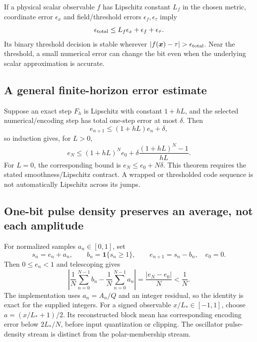 \documentclass[11pt,a4paper]{article}
\newcommand{\ind}{\mathbf{1}}
\numberwithin{equation}{section}
\begin{document}
If a physical scalar observable $f$ has Lipschitz constant $L_f$ in the chosen metric, coordinate error $\epsilon_x$ and field/threshold errors $\epsilon_f,\epsilon_\tau$ imply
\begin{equation}
\epsilon_{\rm total}\le L_f\epsilon_x+\epsilon_f+\epsilon_\tau.
\end{equation}
Its binary threshold decision is stable wherever
$|f(\bm x)-\tau|>\epsilon_{\rm total}$. Near the threshold, a small numerical error can change the bit even when the underlying scalar approximation is accurate.

\subsection{A general finite-horizon error estimate}
Suppose an exact step $F_h$ is Lipschitz with constant $1+hL$, and the selected numerical/encoding step has total one-step error at most $\delta$. Then
\begin{equation}
e_{n+1}\le(1+hL)e_n+\delta,
\end{equation}
so induction gives, for $L>0$,
\begin{equation}
e_N\le(1+hL)^N e_0+
\delta\frac{(1+hL)^N-1}{hL}.
\end{equation}
For $L=0$, the corresponding bound is $e_N\le e_0+N\delta$. This theorem requires the stated smoothness/Lipschitz contract. A wrapped or thresholded code sequence is not automatically Lipschitz across its jumps.

\subsection{One-bit pulse density preserves an average, not each amplitude}
For normalized samples $a_n\in[0,1]$, set
\begin{equation}
s_n=e_n+a_n,\qquad b_n=\ind\{s_n\ge1\},\qquad
 e_{n+1}=s_n-b_n,\quad e_0=0.
\label{eq:sd}
\end{equation}
Then $0\le e_n<1$ and telescoping gives
\begin{equation}
\left|\frac1N\sum_{n=0}^{N-1}b_n-\frac1N\sum_{n=0}^{N-1}a_n\right|
=\frac{|e_N-e_0|}{N}<\frac1N.
\end{equation}
The implementation uses $a_n=A_n/Q$ and an integer residual, so the identity is exact for the supplied integers. For a signed observable $x/L_*\in[-1,1]$, choose $a=(x/L_*+1)/2$. Its reconstructed block mean has corresponding encoding error below $2L_*/N$, before input quantization or clipping. The oscillator pulse-density stream is distinct from the polar-membership stream.
\end{document}
